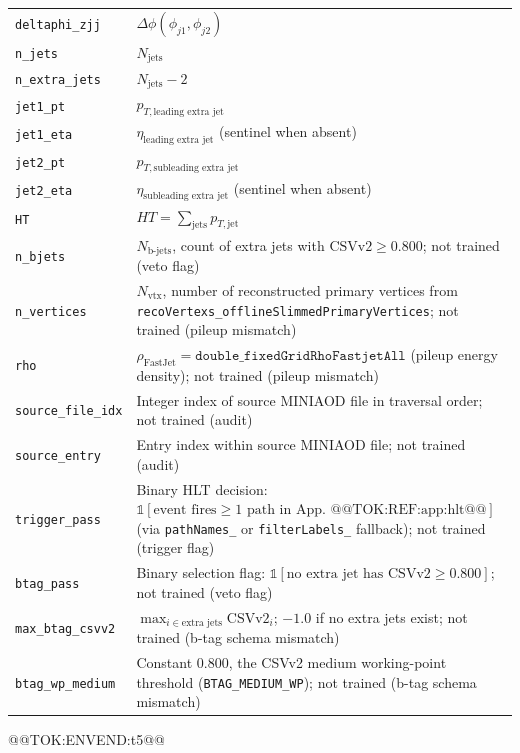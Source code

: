 \documentclass[11pt]{article}
\begin{document}
\begin{table}
\begin{tabular}{@{}>{\raggedright\arraybackslash}p{}>{\raggedright\arraybackslash}p{}@{}}
\texttt{deltaphi\_zjj} & $\Delta\phi(\phi_{j1},\phi_{j2})$ \\
\texttt{n\_jets} & $N_{\text{jets}}$ \\
\texttt{n\_extra\_jets} & $N_{\text{jets}}-2$ \\
\texttt{jet1\_pt} & $p_{T,\text{leading extra jet}}$ \\
\texttt{jet1\_eta} & $\eta_{\text{leading extra jet}}$ (sentinel when absent) \\
\texttt{jet2\_pt} & $p_{T,\text{subleading extra jet}}$ \\
\texttt{jet2\_eta} & $\eta_{\text{subleading extra jet}}$ (sentinel when absent) \\
\texttt{HT} & $HT=\sum_{\text{jets}} p_{T,\text{jet}}$ \\
\texttt{n\_bjets} & $N_{\text{b-jets}}$, count of extra jets with $\mathrm{CSVv2}\geq0.800$; not trained (veto flag) \\
\texttt{n\_vertices} & $N_{\text{vtx}}$, number of reconstructed primary vertices from \texttt{recoVertexs\_offlineSlimmedPrimaryVertices}; not trained (pileup mismatch) \\
\texttt{rho} & $\rho_{\text{FastJet}}=\texttt{double\_fixedGridRhoFastjetAll}$ (pileup energy density); not trained (pileup mismatch) \\
\texttt{source\_file\_idx} & Integer index of source MINIAOD file in traversal order; not trained (audit) \\
\texttt{source\_entry} & Entry index within source MINIAOD file; not trained (audit) \\
\texttt{trigger\_pass} & Binary HLT decision: $\mathbb{1}[\text{event fires}\geq1\text{ path in App.~@@TOK:REF:app:hlt@@}]$ (via \texttt{pathNames\_} or \texttt{filterLabels\_} fallback); not trained (trigger flag) \\
\texttt{btag\_pass} & Binary selection flag: $\mathbb{1}[\text{no extra jet has }\mathrm{CSVv2}\geq0.800]$; not trained (veto flag) \\
\texttt{max\_btag\_csvv2} & $\max_{i\in\text{extra jets}}\mathrm{CSVv2}_i$; $-1.0$ if no extra jets exist; not trained (b-tag schema mismatch) \\
\texttt{btag\_wp\_medium} & Constant $0.800$, the CSVv2 medium working-point threshold (\texttt{BTAG\_MEDIUM\_WP}); not trained (b-tag schema mismatch) \\
\end{tabular}@@TOK:ENVEND:t5@@\end{table}
\normalsize
\end{document}
